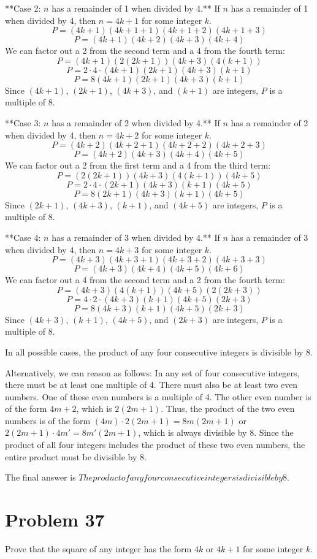 \documentclass{article}
\begin{document}
**Case 2: $n$ has a remainder of 1 when divided by 4.**
If $n$ has a remainder of 1 when divided by 4, then $n = 4k+1$ for some integer $k$.
$$
P = (4k+1)(4k+1+1)(4k+1+2)(4k+1+3)
$$
$$
P = (4k+1)(4k+2)(4k+3)(4k+4)
$$
We can factor out a 2 from the second term and a 4 from the fourth term:
$$
P = (4k+1)(2(2k+1))(4k+3)(4(k+1))
$$
$$
P = 2 \cdot 4 \cdot (4k+1)(2k+1)(4k+3)(k+1)
$$
$$
P = 8(4k+1)(2k+1)(4k+3)(k+1)
$$
Since $(4k+1)$, $(2k+1)$, $(4k+3)$, and $(k+1)$ are integers, $P$ is a multiple of 8.

**Case 3: $n$ has a remainder of 2 when divided by 4.**
If $n$ has a remainder of 2 when divided by 4, then $n = 4k+2$ for some integer $k$.
$$
P = (4k+2)(4k+2+1)(4k+2+2)(4k+2+3)
$$
$$
P = (4k+2)(4k+3)(4k+4)(4k+5)
$$
We can factor out a 2 from the first term and a 4 from the third term:
$$
P = (2(2k+1))(4k+3)(4(k+1))(4k+5)
$$
$$
P = 2 \cdot 4 \cdot (2k+1)(4k+3)(k+1)(4k+5)
$$
$$
P = 8(2k+1)(4k+3)(k+1)(4k+5)
$$
Since $(2k+1)$, $(4k+3)$, $(k+1)$, and $(4k+5)$ are integers, $P$ is a multiple of 8.

**Case 4: $n$ has a remainder of 3 when divided by 4.**
If $n$ has a remainder of 3 when divided by 4, then $n = 4k+3$ for some integer $k$.
$$
P = (4k+3)(4k+3+1)(4k+3+2)(4k+3+3)
$$
$$
P = (4k+3)(4k+4)(4k+5)(4k+6)
$$
We can factor out a 4 from the second term and a 2 from the fourth term:
$$
P = (4k+3)(4(k+1))(4k+5)(2(2k+3))
$$
$$
P = 4 \cdot 2 \cdot (4k+3)(k+1)(4k+5)(2k+3)
$$
$$
P = 8(4k+3)(k+1)(4k+5)(2k+3)
$$
Since $(4k+3)$, $(k+1)$, $(4k+5)$, and $(2k+3)$ are integers, $P$ is a multiple of 8.

In all possible cases, the product of any four consecutive integers is divisible by 8.

Alternatively, we can reason as follows:
In any set of four consecutive integers, there must be at least one multiple of 4. There must also be at least two even numbers. One of these even numbers is a multiple of 4. The other even number is of the form $4m+2$, which is $2(2m+1)$. Thus, the product of the two even numbers is of the form $(4m) \cdot 2(2m+1) = 8m(2m+1)$ or $2(2m+1) \cdot 4m' = 8m'(2m+1)$, which is always divisible by 8. Since the product of all four integers includes the product of these two even numbers, the entire product must be divisible by 8.

The final answer is $\boxed{The product of any four consecutive integers is divisible by 8}$.

\newpage

\section*{Problem 37}
Prove that the square of any integer has the form $4k$ or $4k+1$ for some integer $k$.
\end{document}
